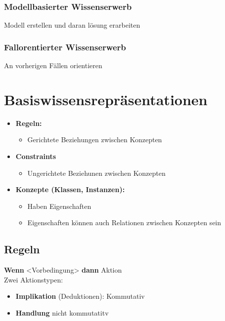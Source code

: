 \documentclass[14pt]{article}
\begin{document}
\subsubsection{Modellbasierter Wissenserwerb}
Modell erstellen und daran lösung erarbeiten
\subsubsection{Fallorentierter Wissenserwerb}
An vorherigen Fällen orientieren

\section{Basiswissensrepräsentationen}
\begin{itemize}
    \item \textbf{Regeln:}
    \begin{itemize}
        \item Gerichtete Beziehungen zwischen Konzepten
    \end{itemize}
    \item \textbf{Constraints}
    \begin{itemize}
        \item Ungerichtete Beziehunen zwischen Konzepten
    \end{itemize}
    \item \textbf{Konzepte (Klassen, Instanzen):}
    \begin{itemize}
        \item Haben Eigenschaften
        \item Eigenschaften können auch Relationen zwischen Konzepten sein
    \end{itemize}
\end{itemize}
\subsection{Regeln}
\textbf{Wenn} <Vorbedingung> \textbf{dann} Aktion \\
Zwei Aktionstypen: 
\begin{itemize}
    \item \textbf{Implikation} (Deduktionen): Kommutativ
    \item \textbf{Handlung} nicht kommutatitv
\end{itemize}
\end{document}
